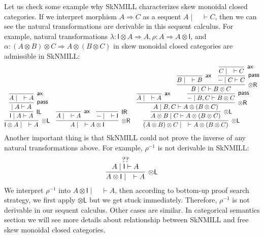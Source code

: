 \documentclass[submission,copyright,creativecommons]{eptcs}
\newcommand{\tl}{\otimes \mathsf{L}}
\newcommand{\tr}{\otimes \mathsf{R}}
\newcommand{\pass}{\mathsf{pass}}
\newcommand{\unitl}{\mathsf{IL}}
\newcommand{\unitr}{\mathsf{IR}}
\newcommand{\ax}{\mathsf{ax}}
\newcommand{\ot}{\otimes}
\newcommand{\I}{\mathsf{I}}
\begin{document}
Let us check some example why SkNMILL characterizes skew monoidal closed categories.
If we interpret morphism $A \Longrightarrow C$ as a sequent $A \mid \quad \vdash C$, then we can see the natural transformations are derivable in this sequent calculus.
For example, natural transformations $\lambda : \I \ot A \Longrightarrow A , \rho : A \Longrightarrow A \ot \I$, and $\alpha : (A \ot B) \ot C \Longrightarrow A \ot (B \ot C)$ in skew monoidal closed categories are admissible in SkNMILL:
\begin{displaymath}
  \infer[\tl]{\I \ot A \mid \quad \vdash A}{
    \infer[\unitl]{\I \mid A \vdash A}{
      \infer[\pass]{ \mid A \vdash A}{
        \infer[\ax]{A \mid \quad \vdash A}{}
      }
    }
  }
  \quad
  \infer[\tr]{A \mid \quad \vdash A \ot \I}{
    \infer[\ax]{A \mid \quad \vdash A}{}
    &
    \infer[\unitr]{- \mid \quad \vdash \I}{}
  }
  \quad
  \infer[\tl]{(A \ot B) \ot C \mid \quad \vdash A \ot (B \ot C)}{
    \infer[\tl]{A \ot B \mid C \vdash A \ot (B \ot C)}{
      \infer[\tr]{A \mid B , C \vdash A \ot (B \ot C)}{
        \infer[\ax]{A \mid \quad \vdash A}{}
        &
        \infer[\pass]{- \mid B , C \vdash B \ot C}{
          \infer[\tr]{B \mid C \vdash B \ot C}{
            \infer[\ax]{B \mid \quad \vdash B}{}
            &
            \infer[\pass]{- \mid C \vdash C}{
              \infer[\ax]{C \mid \quad \vdash C}{}
            }
          }
        }
      }
    }
  }
\end{displaymath}
Another important thing is that SkNMILL could not prove the inverse of any natural transformations above.
For example, $\rho^{-1}$ is not derivable in SkNMILL:
\begin{displaymath}
  \infer[\tl]{A \ot \I \mid \quad \vdash A}{
    \deduce{A \mid \I \vdash A}{??}
  }
\end{displaymath}
We interpret $\rho^{-1}$ into $A \ot \I \mid \quad \vdash A$, then according to bottom-up proof search strategy, we first apply $\tl$ but we get stuck immediately.
Therefore, $\rho^{-1}$ is not derivable in our sequent calculus.
Other cases are similar.
In categorical semantics section we will see more details about relationship between SkNMILL and free skew monoidal closed categories.
\end{document}
